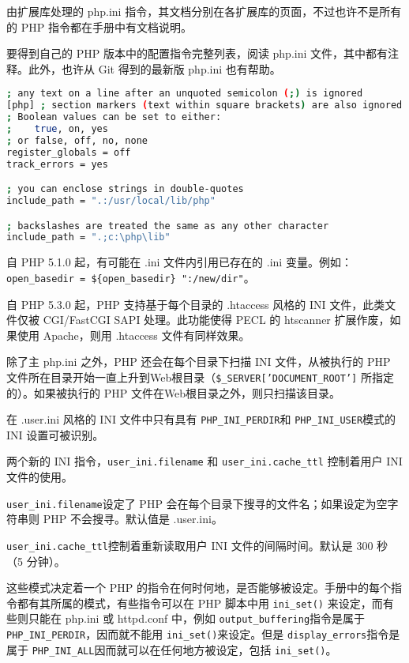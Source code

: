 由扩展库处理的 php.ini 指令，其文档分别在各扩展库的页面，不过也许不是所有的 PHP 指令都在手册中有文档说明。

要得到自己的 PHP 版本中的配置指令完整列表，阅读 php.ini 文件，其中都有注释。此外，也许从 Git 得到的最新版 php.ini 也有帮助。

\begin{lstlisting}[language=bash]
; any text on a line after an unquoted semicolon (;) is ignored
[php] ; section markers (text within square brackets) are also ignored
; Boolean values can be set to either:
;    true, on, yes
; or false, off, no, none
register_globals = off
track_errors = yes

; you can enclose strings in double-quotes
include_path = ".:/usr/local/lib/php"

; backslashes are treated the same as any other character
include_path = ".;c:\php\lib"
\end{lstlisting}

自 PHP 5.1.0 起，有可能在 .ini 文件内引用已存在的 .ini 变量。例如：\texttt{open\_basedir = \$\{open\_basedir\} ":/new/dir"}。


自 PHP 5.3.0 起，PHP 支持基于每个目录的 .htaccess 风格的 INI 文件，此类文件仅被 CGI/FastCGI SAPI 处理。此功能使得 PECL 的 htscanner 扩展作废，如果使用 Apache，则用 .htaccess 文件有同样效果。

除了主 php.ini 之外，PHP 还会在每个目录下扫描 INI 文件，从被执行的 PHP 文件所在目录开始一直上升到Web根目录（\texttt{\$\_SERVER['DOCUMENT\_ROOT']} 所指定的）。如果被执行的 PHP 文件在Web根目录之外，则只扫描该目录。

在 .user.ini 风格的 INI 文件中只有具有 \texttt{PHP\_INI\_PERDIR}和 \texttt{PHP\_INI\_USER}模式的 INI 设置可被识别。

两个新的 INI 指令，\texttt{user\_ini.filename} 和 \texttt{user\_ini.cache\_ttl} 控制着用户 INI 文件的使用。

\begin{compactitem}
\item \texttt{user\_ini.filename}设定了 PHP 会在每个目录下搜寻的文件名；如果设定为空字符串则 PHP 不会搜寻。默认值是 .user.ini。

\item \texttt{user\_ini.cache\_ttl}控制着重新读取用户 INI 文件的间隔时间。默认是 300 秒（5 分钟）。

\end{compactitem}

这些模式决定着一个 PHP 的指令在何时何地，是否能够被设定。手册中的每个指令都有其所属的模式，有些指令可以在 PHP 脚本中用 \texttt{ini\_set()} 来设定，而有些则只能在 php.ini 或 httpd.conf 中，例如 \texttt{output\_buffering}指令是属于 \texttt{PHP\_INI\_PERDIR}，因而就不能用 \texttt{ini\_set()}来设定。但是 \texttt{display\_errors}指令是属于 \texttt{PHP\_INI\_ALL}因而就可以在任何地方被设定，包括 \texttt{ini\_set()}。



